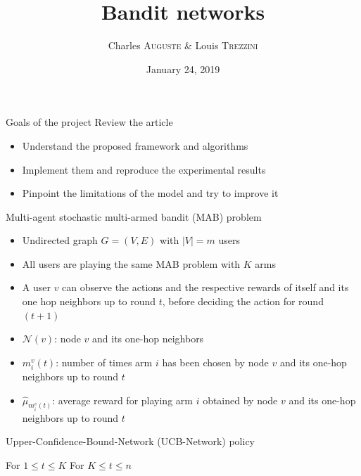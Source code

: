 \documentclass{beamer}
\title{Bandit networks}
\date{January 24, 2019}
\author{Charles \textsc{Auguste} \& Louis \textsc{Trezzini}}
\begin{document}
\maketitle

\begin{frame}{Goals of the project}
Review the article 

\begin{itemize}
  \item Understand the proposed framework and algorithms
  \item Implement them and reproduce the experimental results
  \item Pinpoint the limitations of the model and try to improve it
\end{itemize}
\end{frame}

\begin{frame}{Multi-agent stochastic multi-armed bandit (MAB) problem}
\begin{itemize}
  \item Undirected graph $G = (V, E)$ with $|V| = m$ users
  \item All users are playing the \alert{same} MAB problem with $K$ arms
  \item A user $v$ can observe the actions and the respective rewards of itself and its one hop neighbors up to round $t$, before deciding the action for round $(t+1)$
  \item $\mathcal{N}(v)$: node $v$ and its one-hop neighbors
  \item $m^v_i(t)$: number of times arm $i$ has been chosen by node $v$ and its one-hop neighbors up to round $t$
  \item $\hat{\mu}_{m_i^v(t)}$: average reward for playing arm $i$ obtained by node $v$ and its one-hop neighbors up to round $t$
\end{itemize}

\end{frame}

\begin{frame}{Upper-Confidence-Bound-Network (UCB-Network) policy}
  \begin{algorithm}[H]
    \caption{Upper-Confidence-Bound-Network (UCB-Network)}
    \begin{algorithmic}
        For $1 \leq t \leq K$
        For $K \leq t \leq n$
    \end{algorithmic}
  \end{algorithm}
\end{frame}
\end{document}
